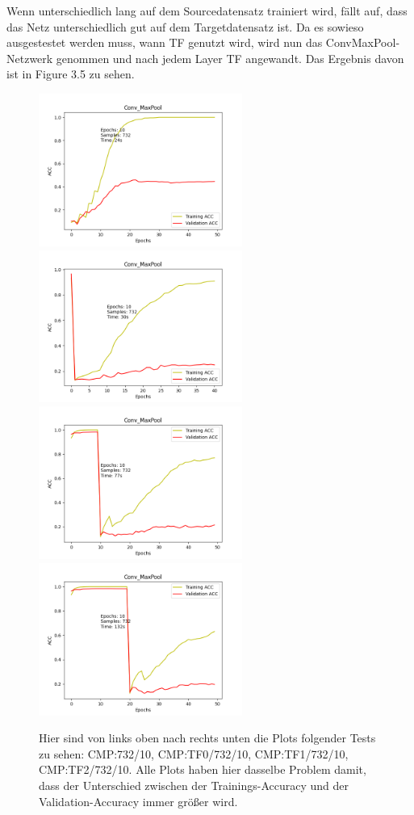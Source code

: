 Wenn unterschiedlich lang auf dem Sourcedatensatz trainiert wird, fällt auf, dass das Netz unterschiedlich gut auf dem Targetdatensatz ist. 
Da es sowieso ausgestestet werden muss, wann TF genutzt wird, wird nun das ConvMaxPool-Netzwerk genommen und nach jedem Layer TF angewandt. 
Das Ergebnis davon ist in Figure 3.5 zu sehen. 

\begin{figure}[htpb]
    \includegraphics[height=5cm]{../../Plots/ba_plots/convmaxpool/wotr.png}
    \includegraphics[height=5cm]{../../Plots/ba_plots/convmaxpool/epochTFtr.png}
    \includegraphics[height=5cm]{../../Plots/ba_plots/convmaxpool/1TFtr.png}
    \includegraphics[height=5cm]{../../Plots/ba_plots/convmaxpool/2TFtr.png}
    \caption{\label{fig:layertf} 
    \small{Hier sind von links oben nach rechts unten die Plots folgender Tests zu sehen: 
    CMP:732/10, CMP:TF0/732/10, CMP:TF1/732/10, CMP:TF2/732/10. Alle Plots haben hier dasselbe Problem damit, dass der Unterschied 
    zwischen der Trainings-Accuracy und der Validation-Accuracy immer größer wird.}}
\end{figure}

